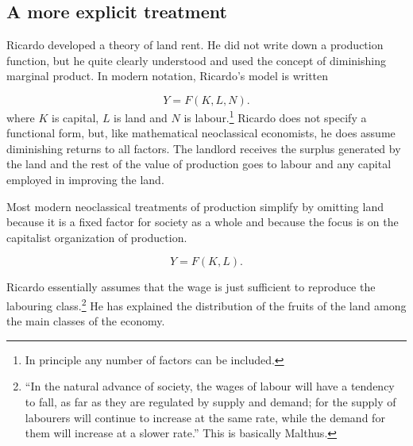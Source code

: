 \subsection{A more explicit treatment}
Ricardo developed a theory of land rent. He did not write down a production function, but he quite clearly understood and used the concept of diminishing marginal product. In modern notation, Ricardo's model is written


\begin{equation} 
Y=F(K,L,N).
\label{Eqn:Prod1}
\end{equation} 
where $K$ is capital, $L$ is land and $N$  is labour.\footnote{In principle any number of factors can be included.} 
Ricardo does not specify a functional form, but, like mathematical neoclassical economists, he does assume diminishing returns to all factors. The landlord  receives the surplus generated by the land and the rest of the value of production goes to labour and any capital employed in improving the land. 

Most modern neoclassical treatments of production simplify by omitting land because it is a fixed factor  for society as a whole and because the focus is on the capitalist organization of production. 

\begin{equation} 
Y=F(K,L).
\label{Eqn:Prod1}
\end{equation} 






Ricardo essentially assumes that the wage is  just sufficient to reproduce the labouring class.\footnote{ ``In the natural advance of society, the wages of labour will have a tendency to fall, as far as they are regulated by supply and demand; for the supply of labourers will continue to increase at the same rate, while the demand for them will increase at a slower rate.''  This is  basically Malthus.} He has explained the distribution of the fruits of the land among the main classes of the economy.

